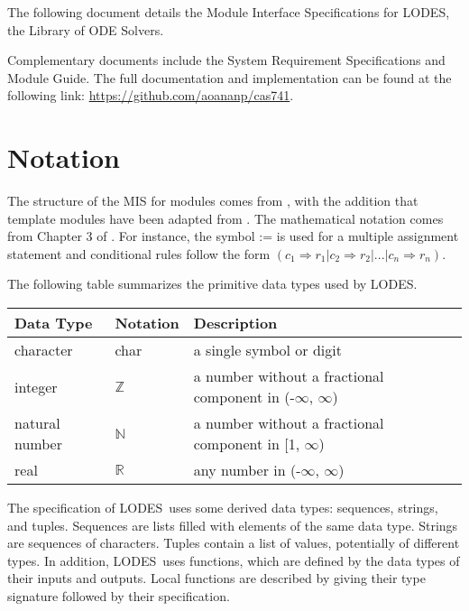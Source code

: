 \documentclass[12pt, titlepage]{article}
\newcommand{\progname}{LODES}
\newcommand{\progdesc}{Library of ODE Solvers}
\begin{document}
The following document details the Module Interface Specifications for
\progname{}, the \progdesc{}.

Complementary documents include the System Requirement Specifications
and Module Guide.  The full documentation and implementation can be
found at the following link: \url{https://github.com/aoananp/cas741}. 


\section{Notation}


The structure of the MIS for modules comes from \citet{HoffmanAndStrooper1995},
with the addition that template modules have been adapted from
\cite{GhezziEtAl2003}.  The mathematical notation comes from Chapter 3 of
\citet{HoffmanAndStrooper1995}.  For instance, the symbol := is used for a
multiple assignment statement and conditional rules follow the form $(c_1
\Rightarrow r_1 | c_2 \Rightarrow r_2 | ... | c_n \Rightarrow r_n )$.

The following table summarizes the primitive data types used by \progname. 

\begin{center}
\renewcommand{\arraystretch}{1.2}
\noindent 
\begin{tabular}{l l p{7.5cm}} 
\toprule 
\textbf{Data Type} & \textbf{Notation} & \textbf{Description}\\ 
\midrule
character & char & a single symbol or digit\\
integer & $\mathbb{Z}$ & a number without a fractional component in (-$\infty$, $\infty$) \\
natural number & $\mathbb{N}$ & a number without a fractional component in [1, $\infty$) \\
real & $\mathbb{R}$ & any number in (-$\infty$, $\infty$)\\
\bottomrule
\end{tabular} 
\end{center}

\noindent
The specification of \progname \ uses some derived data types: sequences, strings, and
tuples. Sequences are lists filled with elements of the same data type. Strings
are sequences of characters. Tuples contain a list of values, potentially of
different types. In addition, \progname \ uses functions, which
are defined by the data types of their inputs and outputs. Local functions are
described by giving their type signature followed by their specification.
\end{document}
